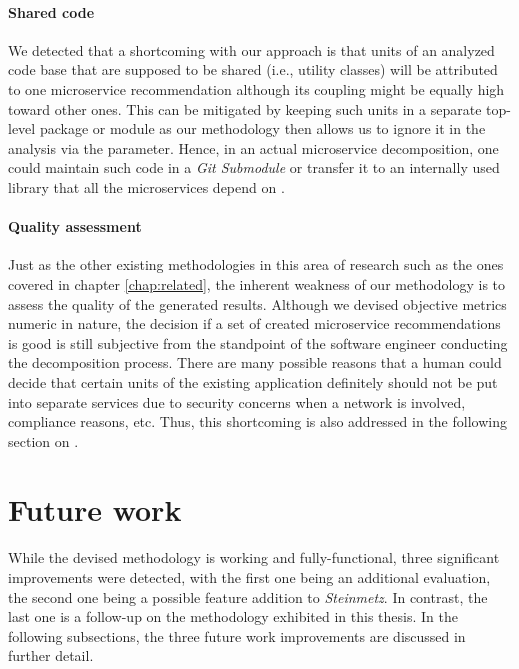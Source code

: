 \documentclass[12pt,a4paper]{report}
\begin{document}
\paragraph{Shared code}
We detected that a shortcoming with our approach is
that units of an analyzed code base that are supposed to be shared (i.e.,
utility classes) will be attributed to one microservice recommendation although
its coupling might be equally high toward other ones. This can be mitigated by
keeping such units in a separate top-level package or module as our methodology
then allows us to ignore it in the analysis via the  parameter. Hence, in an actual microservice
decomposition, one could maintain such code in a \textit{Git Submodule} or
transfer it to an internally used library that all the microservices depend on
\cite{git-submodules}.

\paragraph{Quality assessment}
Just as the other existing methodologies in this
area of research such as the ones covered in chapter \ref{chap:related}, the
inherent weakness of our methodology is to assess the quality of the generated
results. Although we devised objective metrics numeric in nature, the decision
if a set of created microservice recommendations is good is still subjective
from the standpoint of the software engineer conducting the decomposition
process. There are many possible reasons that a human could decide that certain
units of the existing application definitely should not be put into separate
services due to security concerns when a network is involved, compliance
reasons, etc. Thus, this shortcoming is also addressed in the following section
on \textit{}.



\section{Future work} \label{sect:future-work}

While the devised methodology is working and fully-functional, three
significant improvements were detected, with the first one being an additional
evaluation, the second one being a possible feature addition to \textit{
Steinmetz}. In contrast, the last one is a follow-up on the methodology
exhibited in this thesis. In the following subsections, the three future work
improvements are discussed in further detail.
\end{document}
